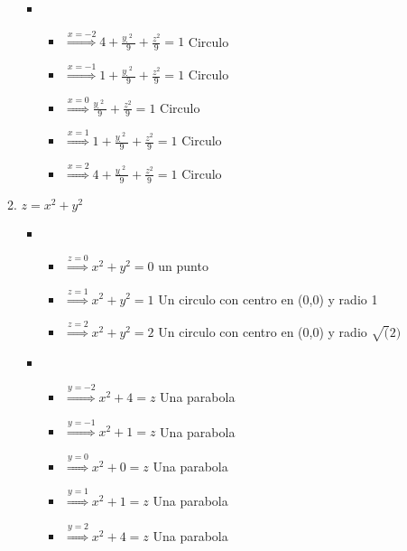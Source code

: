 \documentclass[../practica_02.tex]{subfiles}
\begin{document}
\begin{enumerate}
\begin{enumerate}
\begin{itemize}
                        \item
                            \begin{itemize}
                                \item $\stackrel{x=-2}{\Rightarrow} 4 + \frac{ỵ^2}{9} + \frac{z^2}{9} = 1$ Circulo
                                \item $\stackrel{x=-1}{\Rightarrow} 1 + \frac{ỵ^2}{9} + \frac{z^2}{9} = 1$ Circulo
                                \item $\stackrel{x=0}{\Rightarrow} \frac{ỵ^2}{9} + \frac{z^2}{9} = 1$ Circulo
                                \item $\stackrel{x=1}{\Rightarrow} 1 + \frac{ỵ^2}{9} + \frac{z^2}{9} = 1$ Circulo
                                \item $\stackrel{x=2}{\Rightarrow} 4 + \frac{ỵ^2}{9} + \frac{z^2}{9} = 1$ Circulo
                            \end{itemize}

                    \end{itemize}

                \item $z = x^2 + y^2$

                    \begin{itemize}
                        \item
                            \begin{itemize}
                                \item $\stackrel{z=0}{\Rightarrow} x^2 + y^2 = 0$ un punto
                                \item $\stackrel{z=1}{\Rightarrow} x^2 + y^2 = 1$ Un circulo con centro en (0,0) y radio 1
                                \item $\stackrel{z=2}{\Rightarrow} x^2 + y^2 = 2$ Un circulo con centro en (0,0) y radio $\sqrt(2)$
                            \end{itemize}

                        \item
                            \begin{itemize}
                                \item $\stackrel{y=-2}{\Rightarrow} x^2 + 4 = z $ Una parabola
                                \item $\stackrel{y=-1}{\Rightarrow} x^2 + 1 = z $ Una parabola
                                \item $\stackrel{y=0}{\Rightarrow} x^2 +  0 = z $ Una parabola
                                \item $\stackrel{y=1}{\Rightarrow} x^2 +  1 = z $ Una parabola
                                \item $\stackrel{y=2}{\Rightarrow} x^2 +  4 = z $ Una parabola
                            \end{itemize}


\end{itemize}
\end{enumerate}
\end{enumerate}
\end{document}
